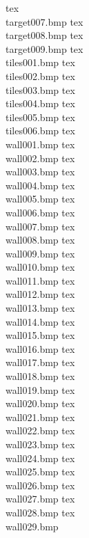 tex\\target007.bmp
tex\\target008.bmp
tex\\target009.bmp
tex\\tiles001.bmp
tex\\tiles002.bmp
tex\\tiles003.bmp
tex\\tiles004.bmp
tex\\tiles005.bmp
tex\\tiles006.bmp
tex\\wall001.bmp
tex\\wall002.bmp
tex\\wall003.bmp
tex\\wall004.bmp
tex\\wall005.bmp
tex\\wall006.bmp
tex\\wall007.bmp
tex\\wall008.bmp
tex\\wall009.bmp
tex\\wall010.bmp
tex\\wall011.bmp
tex\\wall012.bmp
tex\\wall013.bmp
tex\\wall014.bmp
tex\\wall015.bmp
tex\\wall016.bmp
tex\\wall017.bmp
tex\\wall018.bmp
tex\\wall019.bmp
tex\\wall020.bmp
tex\\wall021.bmp
tex\\wall022.bmp
tex\\wall023.bmp
tex\\wall024.bmp
tex\\wall025.bmp
tex\\wall026.bmp
tex\\wall027.bmp
tex\\wall028.bmp
tex\\wall029.bmp